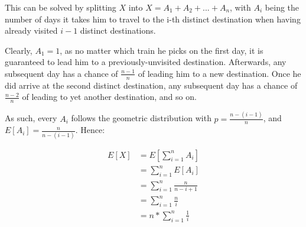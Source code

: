 \documentclass[a4paper]{scrreprt}
\begin{document}
This can be solved by splitting $X$ into $X = A_1 + A_2 + ... + A_n$, with
$A_i$ being the number of days it takes him to travel to the i-th distinct
destination when having already visited $i-1$ distinct destinations.

Clearly, $A_1 = 1$, as no matter which train he picks on the first day, it is
guaranteed to lead him to a previously-unvisited destination. Afterwards, any
subsequent day has a chance of $\frac{n-1}{n}$ of leading him to a new
destination. Once he did arrive at the second distinct destination, any
subsequent day has a chance of $\frac{n-2}{n}$ of leading to yet another
destination, and so on.

As such, every $A_i$ follows the geometric distribution with $p =
\frac{n-(i-1)}{n}$, and $E[A_i] = \frac{n}{n-(i-1)}$. Hence:

\begin{align*}
	E[X] & = E\left[\sum_{i=1}^{n}{A_i}\right] \\
	     & = \sum_{i=1}^{n}{E[A_i]} \\
	     & = \sum_{i=1}^{n}{\frac{n}{n-i+1}} \\
	     & = \sum_{i=1}^{n}{\frac{n}{i}} \\
	     & = n * \sum_{i=1}^{n}{\frac{1}{i}}
\end{align*}
\end{document}
